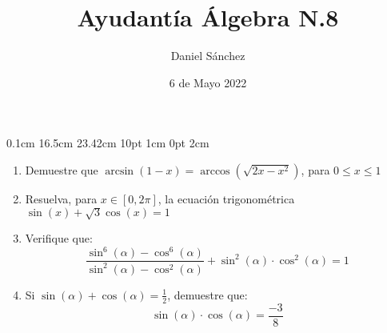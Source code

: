 \documentclass[12pt]{article}
\newcommand{\D}{\displaystyle}
\begin{document}
\setmargins{2.5cm}
{0.1cm}
{16.5cm}
{23.42cm}
{10pt}
{1cm}
{0pt}
{2cm}

\title{Ayudant\'ia \'Algebra N.8}
\date{6 de Mayo 2022}
\author{Daniel S\'anchez}
\maketitle

\begin{enumerate}
      \item Demuestre que $\D \arcsin(1-x)=\arccos(\sqrt{2x-x^2})$, para $0 \leq x \leq 1$
      \item Resuelva, para $x \in [0,2\pi]$, la ecuaci\'on trigonom\'etrica $\sin(x) + \sqrt{3}\cos(x)=1$
      \item Verifique que:
            $$\frac{\sin^6(\alpha) - \cos^6(\alpha)}{\sin^2(\alpha) - \cos^2(\alpha)} + \sin^2(\alpha)\cdot \cos^2(\alpha) = 1$$
      \item Si $\D \sin(\alpha) + \cos(\alpha) = \frac{1}{2}$, demuestre que:
            $$\sin(\alpha)\cdot \cos(\alpha) = \frac{-3}{8}$$
            
\end{enumerate}
\end{document}
